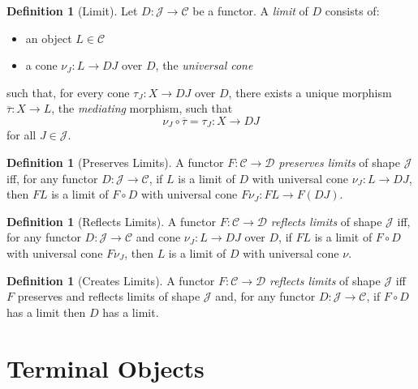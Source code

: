 \documentclass{book}
\theoremstyle{definition}
\newtheorem{df}[lm]{Definition}
\begin{document}
  \begin{df}[Limit]
    Let $D : \mathcal{J} \rightarrow \mathcal{C}$ be a functor. A \emph{limit} 
    of 
    $D$ consists of:
    \begin{itemize}
      \item an object $L \in \mathcal{C}$
      \item a cone $\nu_J : L \rightarrow D J$ over $D$, the \emph{universal 
        cone}
    \end{itemize}
    such that, for every cone $\tau_J : X \rightarrow D J$ over $D$, there 
    exists a 
    unique morphism $\overline{\tau} : X \rightarrow L$, the \emph{mediating} 
    morphism, such that
    \[ \nu_J \circ \overline{\tau} = \tau_J : X \rightarrow D J \]
    for all $J \in \mathcal{J}$.
  \end{df}
  
  \begin{df}[Preserves Limits]
    A functor $F : \mathcal{C} \rightarrow \mathcal{D}$ \emph{preserves limits} 
    of shape $\mathcal{J}$ iff, for any functor $D : \mathcal{J} \rightarrow 
    \mathcal{C}$, if $L$ is a limit of $D$ with universal cone $\nu_J : L 
    \rightarrow D J$, then $FL$ is a limit of $F \circ D$ with universal cone 
    $F 
    \nu_J : F L \rightarrow F (D J)$.
  \end{df}
  
  \begin{df}[Reflects Limits]
    A functor $F : \mathcal{C} \rightarrow \mathcal{D}$ \emph{reflects limits} 
    of shape $\mathcal{J}$ iff, for any functor $D : \mathcal{J} \rightarrow 
    \mathcal{C}$ and cone $\nu_J : L \rightarrow D J$ over $D$, if $F L$ is a 
    limit 
    of $F \circ D$ with universal cone $F \nu_J$, then $L$ is a limit of $D$ 
    with 
    universal cone $\nu$.
  \end{df}
  
  \begin{df}[Creates Limits]
    A functor $F : \mathcal{C} \rightarrow \mathcal{D}$ \emph{reflects limits} 
    of shape $\mathcal{J}$ iff $F$ preserves and reflects limits of shape 
    $\mathcal{J}$ and, for any functor $D : \mathcal{J} \rightarrow 
    \mathcal{C}$, if $F \circ D$ has a limit then $D$ has a limit.
  \end{df}
  
  \section{Terminal Objects}
  
\end{document}
